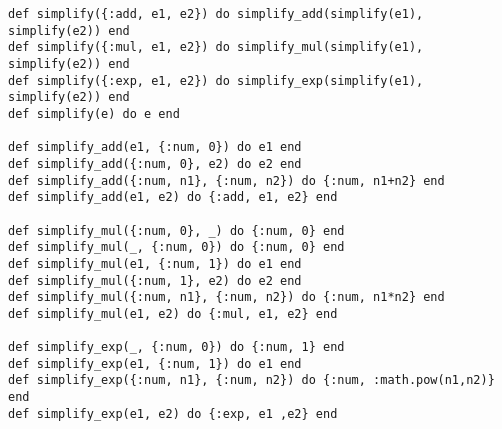 \begin{verbatim}
def simplify({:add, e1, e2}) do simplify_add(simplify(e1), simplify(e2)) end
def simplify({:mul, e1, e2}) do simplify_mul(simplify(e1), simplify(e2)) end
def simplify({:exp, e1, e2}) do simplify_exp(simplify(e1), simplify(e2)) end
def simplify(e) do e end

def simplify_add(e1, {:num, 0}) do e1 end
def simplify_add({:num, 0}, e2) do e2 end
def simplify_add({:num, n1}, {:num, n2}) do {:num, n1+n2} end
def simplify_add(e1, e2) do {:add, e1, e2} end

def simplify_mul({:num, 0}, _) do {:num, 0} end
def simplify_mul(_, {:num, 0}) do {:num, 0} end
def simplify_mul(e1, {:num, 1}) do e1 end
def simplify_mul({:num, 1}, e2) do e2 end
def simplify_mul({:num, n1}, {:num, n2}) do {:num, n1*n2} end
def simplify_mul(e1, e2) do {:mul, e1, e2} end

def simplify_exp(_, {:num, 0}) do {:num, 1} end
def simplify_exp(e1, {:num, 1}) do e1 end
def simplify_exp({:num, n1}, {:num, n2}) do {:num, :math.pow(n1,n2)} end
def simplify_exp(e1, e2) do {:exp, e1 ,e2} end
\end{verbatim}

